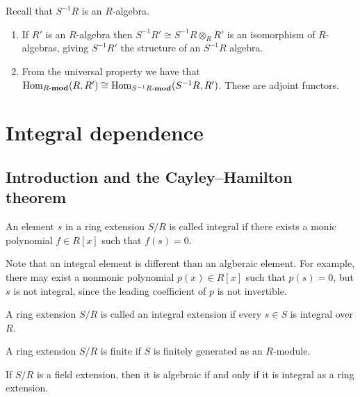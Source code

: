 \documentclass[11pt,a4paper]{article}
\begin{document}
\begin{remark}
  Recall that $S^{-1}R$ is an $R$-algebra.
  \begin{enumerate}
    \item[(1)] If $R'$ is an $R$-algebra
      then $S^{-1}R' \cong S^{-1}R \otimes_{R} R'$ is an isomorphism of
      $R$-algebras, giving $S^{-1}R'$ the structure of an $S^{-1}R$ algebra.
    \item[(2)] From the universal property we have that
      $\operatorname{Hom}_{R\text{-}\mathbf{mod}}(R,R') \cong
      \operatorname{Hom}_{S^{-1}R\text{-}\mathbf{mod}}(S^{-1}R,R')$.
      These are adjoint functors.
  \end{enumerate}
\end{remark}

\newpage

\section{Integral dependence}
\subsection{Introduction and the Cayley--Hamilton theorem}
\begin{definition}
  An element $s$ in a ring extension $S/R$ is called integral if there
  exists a monic polynomial $f \in R[x]$ such that $f(s) = 0$.
\end{definition}

\begin{remark}
  Note that an integral element is different than an algberaic element.
  For example, there may exist a nonmonic polynomial $p(x) \in R[x]$
  such that $p(s) = 0$, but $s$ is not integral, since the leading coefficient
  of $p$ is not invertible.
\end{remark}

\begin{definition}
  A ring extension $S/R$ is called an integral extension if every $s \in S$
  is integral over $R$.
\end{definition}

\begin{definition}
  A ring extension $S/R$ is finite if $S$ is finitely generated as an
  $R$-module.
\end{definition}

\begin{remark}
  If $S/R$ is a field extension, then it is algebraic if and only if
  it is integral as a ring extension.
\end{remark}
\end{document}
